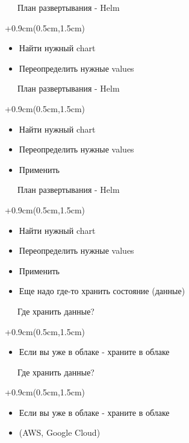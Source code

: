 \documentclass[xetex,18pt,aspectratio=43]{beamer}
\begin{document}
\begin{Large}
\begin{frame}{\ \ \ План развертывания - Helm}
\begin{textblock*}{\framewidth+0.9cm}(0.5cm,1.5cm)
\begin{itemize}
  \item Найти нужный chart
  \item Переопределить нужные values
\end{itemize}
\end{textblock*}
\end{frame}

\begin{frame}{\ \ \ План развертывания - Helm}
\begin{textblock*}{\framewidth+0.9cm}(0.5cm,1.5cm)
\begin{itemize}
  \item Найти нужный chart
  \item Переопределить нужные values
  \item Применить
\end{itemize}
\end{textblock*}
\end{frame}

\begin{frame}{\ \ \ План развертывания - Helm}
\begin{textblock*}{\framewidth+0.9cm}(0.5cm,1.5cm)
\begin{itemize}
  \item Найти нужный chart
  \item Переопределить нужные values
  \item Применить
  \item Еще надо где-то хранить состояние (данные)
\end{itemize}
\end{textblock*}
\end{frame}

\begin{frame}{\ \ \ Где хранить данные?}
\begin{textblock*}{\framewidth+0.9cm}(0.5cm,1.5cm)
\begin{itemize}
  \item Если вы уже в облаке - храните в облаке
\end{itemize}
\end{textblock*}
\end{frame}

\begin{frame}{\ \ \ Где хранить данные?}
\begin{textblock*}{\framewidth+0.9cm}(0.5cm,1.5cm)
\begin{itemize}
  \item Если вы уже в облаке - храните в облаке
  \item (AWS, Google Cloud)
\end{itemize}
\end{textblock*}
\end{frame}


\end{Large}
\end{document}
